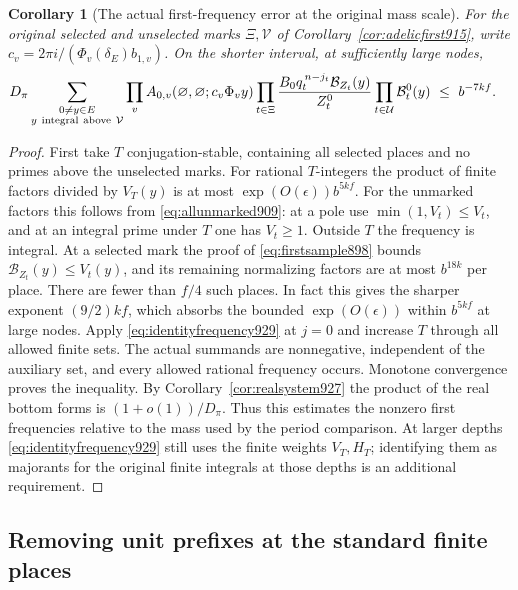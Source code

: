 \documentclass[a4paper,11pt]{article}
\newtheorem{corollary}[proposition]{Corollary}
\theoremstyle{definition}
\theoremstyle{remark}
\numberwithin{equation}{section}
\begin{document}
\begin{corollary}[The actual first-frequency error at the original mass scale]
\leavevmode\label{cor:actualidentity929}
For the original selected and unselected marks \(\Xi,\mathcal V\)
of Corollary~\ref{cor:adelicfirst915}, write
\(c_v=2\pi i/(\Phi_v(\delta_E)b_{1,v})\). On the shorter interval,
at sufficiently large nodes,
\begin{align*}
 D_\pi\sum_{\substack{0\ne y\in E\\ y\ {\rm integral\ above}\ \mathcal V}}
 &\prod_v A_{0,v}(\varnothing,\varnothing;c_v\Phi_v y)
  \prod_{t\in\Xi}\frac{B_0 q_t^{\,n-j_t}\mathcal B_{Z_t}(y)}{Z_t^0}
  \prod_{t\in\mathcal U}\mathcal B_t^0(y)
       \ \le\ b^{-7kf}.
\end{align*}
\end{corollary}
\begin{proof}
First take \(T\) conjugation-stable, containing all selected
places and no primes above the unselected marks. For rational
\(T\)-integers the product of finite factors divided by \(V_T(y)\)
is at most \(\exp(O(\epsilon)) b^{5kf}\). For the unmarked factors
this follows from \eqref{eq:allunmarked909}: at a pole use
\(\min(1,V_t)\le V_t\), and at an integral prime under \(T\)
one has \(V_t\ge1\). Outside \(T\) the frequency is integral.
At a selected mark the proof of \eqref{eq:firstsample898}
bounds \(\mathcal B_{Z_t}(y)\le V_t(y)\), and its remaining
normalizing factors are at most \(b^{18k}\) per place. There
are fewer than \(f/4\) such places. In fact this gives the
sharper exponent \( (9/2) kf\), which absorbs the bounded
\(\exp(O(\epsilon))\) within \(b^{5kf}\) at large nodes.
Apply \eqref{eq:identityfrequency929} at \(j=0\) and increase
\(T\) through all allowed finite sets. The actual summands are
nonnegative, independent of the auxiliary set, and every
allowed rational frequency occurs. Monotone convergence proves
the inequality. By Corollary~\ref{cor:realsystem927} the product
of the real bottom forms is \((1+o(1))/D_\pi\).
Thus this estimates the nonzero first frequencies relative to
the mass used by the period comparison. At larger depths
\eqref{eq:identityfrequency929} still uses the finite weights
\(V_T,H_T\); identifying them as majorants for the original
finite integrals at those depths is an additional requirement.
\end{proof}
\clearpage

\subsection{Removing unit prefixes at the standard finite places}
\label{sec:finiteunitreduce930}
\end{document}
